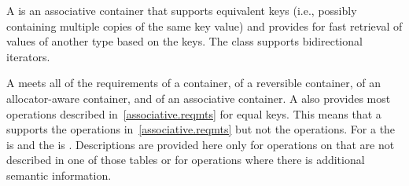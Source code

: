 \pnum
{}%
A
is an associative container that supports equivalent keys (i.e., possibly containing multiple copies of
the same key value) and provides for fast retrieval of values of another type
based on the keys.
The
class
supports bidirectional iterators.

\pnum
A  meets all of the requirements
of a container,
of a reversible container,
of an allocator-aware container, and
of an associative container.
A
also provides most operations described in~\ref{associative.reqmts}
for equal keys.
This means that a
supports the
operations in~\ref{associative.reqmts}
but not the
operations.
For a
the
is
and the
is
.
Descriptions are provided here only for operations on
that are not described in one of those tables
or for operations where there is additional semantic information.

